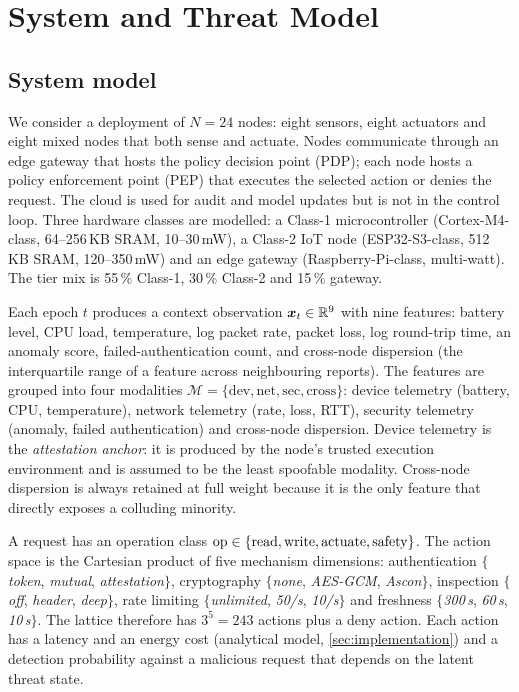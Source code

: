 \section{System and Threat Model}
\label{sec:threat-model}

\subsection{System model}
\label{sec:system-model}

We consider a deployment of $N=24$ nodes: eight sensors, eight actuators and
eight mixed nodes that both sense and actuate. Nodes communicate through an edge
gateway that hosts the policy decision point (PDP); each node hosts a policy
enforcement point (PEP) that executes the selected action or denies the request.
The cloud is used for audit and model updates but is not in the control loop.
Three hardware classes are modelled: a Class-1 microcontroller (Cortex-M4-class,
64--256\,KB SRAM, 10--30\,mW), a Class-2 IoT node (ESP32-S3-class, 512\,KB SRAM,
120--350\,mW) and an edge gateway (Raspberry-Pi-class, multi-watt). The tier mix
is 55\,\% Class-1, 30\,\% Class-2 and 15\,\% gateway.

Each epoch $t$ produces a context observation $\boldsymbol{x}_t\in\mathbb{R}^9$ with nine
features: battery level, CPU load, temperature, log packet rate, packet loss,
log round-trip time, an anomaly score, failed-authentication count, and
cross-node dispersion (the interquartile range of a feature across neighbouring
reports). The features are grouped into four modalities
$\mathcal{M}=\{\mathrm{dev},\mathrm{net},\mathrm{sec},\mathrm{cross}\}$:
device telemetry (battery, CPU, temperature), network telemetry (rate, loss,
RTT), security telemetry (anomaly, failed authentication) and cross-node
dispersion. Device telemetry is the \emph{attestation anchor}: it is produced by
the node's trusted execution environment and is assumed to be the least
spoofable modality. Cross-node dispersion is always retained at full weight
because it is the only feature that directly exposes a colluding minority.

A request has an operation class
$\mathrm{op}\in\{\mathrm{read},\mathrm{write},\mathrm{actuate},\mathrm{safety}\}$.
The action space is the Cartesian product of five mechanism dimensions:
authentication $\{$\emph{token}, \emph{mutual}, \emph{attestation}$\}$,
cryptography $\{$\emph{none}, \emph{AES-GCM}, \emph{Ascon}$\}$,
inspection $\{$\emph{off}, \emph{header}, \emph{deep}$\}$,
rate limiting $\{$\emph{unlimited}, \emph{50/s}, \emph{10/s}$\}$ and freshness
$\{$\emph{300\,s}, \emph{60\,s}, \emph{10\,s}$\}$. The lattice therefore has
$3^5=243$ actions plus a deny action. Each action has a latency and an energy
cost (analytical model, \cref{sec:implementation}) and a detection probability
against a malicious request that depends on the latent threat state.

